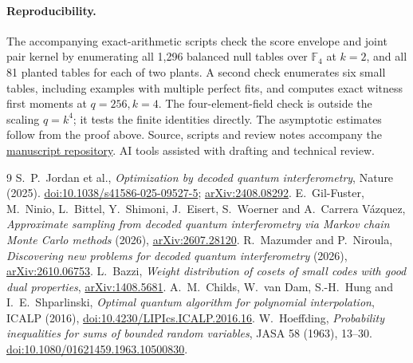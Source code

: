 \documentclass[11pt]{article}
\newcommand{\F}{\mathbb F}
\begin{document}
\paragraph{Reproducibility.}
The accompanying exact-arithmetic scripts check the score envelope and joint pair kernel by enumerating all 1,296 balanced null tables over $\F_4$ at $k=2$, and all 81 planted tables for each of two plants. A second check enumerates six small tables, including examples with multiple perfect fits, and computes exact witness first moments at $q=256,k=4$. The four-element-field check is outside the scaling $q=k^4$; it tests the finite identities directly. The asymptotic estimates follow from the proof above. Source, scripts and review notes accompany the \href{https://github.com/Quantyra/planted-dqi-score-transcripts}{manuscript repository}. AI tools assisted with drafting and technical review.

\begin{thebibliography}{9}
 S.\ P.\ Jordan et al., \emph{Optimization by decoded quantum interferometry}, Nature (2025). \href{https://doi.org/10.1038/s41586-025-09527-5}{doi:10.1038/s41586-025-09527-5}; \href{https://arxiv.org/abs/2408.08292}{arXiv:2408.08292}.
 E.\ Gil-Fuster, M.\ Ninio, L.\ Bittel, Y.\ Shimoni, J.\ Eisert, S.\ Woerner and A.\ Carrera V\'azquez, \emph{Approximate sampling from decoded quantum interferometry via Markov chain Monte Carlo methods} (2026), \href{https://arxiv.org/abs/2607.28120}{arXiv:2607.28120}.
 R.\ Mazumder and P.\ Niroula, \emph{Discovering new problems for decoded quantum interferometry} (2026), \href{https://arxiv.org/abs/2610.06753}{arXiv:2610.06753}.
 L.\ Bazzi, \emph{Weight distribution of cosets of small codes with good dual properties}, \href{https://arxiv.org/abs/1408.5681}{arXiv:1408.5681}.
 A.\ M.\ Childs, W.\ van Dam, S.-H.\ Hung and I.\ E.\ Shparlinski, \emph{Optimal quantum algorithm for polynomial interpolation}, ICALP (2016), \href{https://doi.org/10.4230/LIPIcs.ICALP.2016.16}{doi:10.4230/LIPIcs.ICALP.2016.16}.
 W.\ Hoeffding, \emph{Probability inequalities for sums of bounded random variables}, JASA 58 (1963), 13--30. \href{https://doi.org/10.1080/01621459.1963.10500830}{doi:10.1080/01621459.1963.10500830}.
\end{thebibliography}
\end{document}
